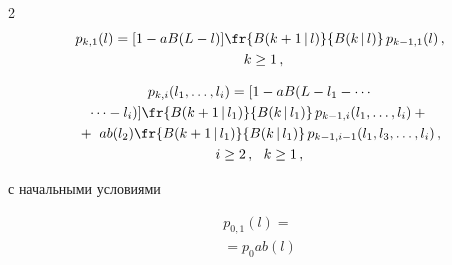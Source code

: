 \begin{multicols}{2}
\begin{multline}
\label{6.2.1}


p_{k,1}(l)


=


[1 - a B(L-l)]


\fr{B(k+1\,|\,l)}{B(k\,|\,l)}


\,p_{k-1,1}(l)\,,\\


\enskip k\ge 1\,,


\end{multline}







\vspace*{-9pt}





\noindent


\begin{multline}


p_{k,i}(l_1,\ldots,l_i)


=


[1 - a B(L-l_1-\cdots\\


\cdots -l_i)]


\fr{B(k+1\,|\,l_1)}{B(k\,|\,l_1)}


\,p_{k-1,i}(l_1,\ldots,l_i)


 +{}\\


{}


+\


a b(l_2)


\fr{B(k+1\,|\,l_1)}{ B(k\,|\,l_1)}


\,p_{k-1,i-1}(l_1,l_3,\ldots,l_i)\,,


\\


i \ge 2\,,\ \  k\ge 1\,,


\label{6.2.2}


\end{multline}




с начальными условиями


\begin{multline}


\label{6.2.3}


p_{0,1}(l)


={}\\


{}=p_0 a b(l)



\end{multline}
\end{multicols}
